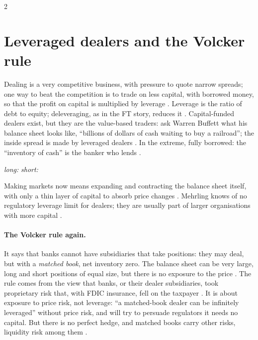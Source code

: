 \begin{paracol}{2}
\section{Leveraged dealers and the Volcker rule}\label{sec:dl-leverage}

Dealing is a very competitive business, with pressure to quote narrow spreads; one way to beat the competition is to trade on less capital, with borrowed money, so that the profit on
capital is multiplied by leverage . Leverage is the ratio of debt to equity; deleveraging, as in the FT story, reduces it .
Capital-funded dealers exist, but they are the value-based traders: ask Warren Buffett what his balance sheet looks like, ``billions of dollars of cash waiting to buy a railroad''; the
inside spread is made by leveraged dealers . In the extreme, fully borrowed: the ``inventory of cash'' is the banker who lends .
\begin{taccts}
\textit{long:}\quad{}\qquad
\textit{short:}\quad{}
\end{taccts}
Making markets now means expanding and contracting the balance sheet itself, with only a thin layer of capital to absorb price changes . Mehrling knows
of no regulatory leverage limit for dealers; they are usually part of larger organisations with more capital .

\paragraph{The Volcker rule again.} It says that banks cannot have subsidiaries that take positions: they may deal, but with a \emph{matched book}, net inventory zero. The balance sheet can
be very large, long and short positions of equal size, but there is no exposure to the price . The rule comes from the view that banks, or their
dealer subsidiaries, took proprietary risk that, with FDIC insurance, fell on the taxpayer . It is about exposure to price risk, not leverage: ``a matched-book dealer can be
infinitely leveraged'' without price risk, and will try to persuade regulators it needs no capital. But there is no perfect hedge, and matched books carry other risks, liquidity risk among
them .


\end{paracol}
